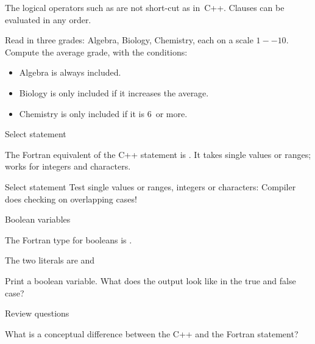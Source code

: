 The logical operators such as  are not short-cut as
in~C++. Clauses can be evaluated in any order.

\begin{exercise}
  Read in three grades: Algebra, Biology, Chemistry, each on a scale
  $1--10$. Compute the average grade, with the conditions:
  \begin{itemize}
  \item Algebra is always included.
  \item Biology is only included if it increases the average.
  \item Chemistry is only included if it is 6~or more.
  \end{itemize}
\end{exercise}

 {Select statement}

The Fortran equivalent of the C++  statement is . It takes
single values or ranges; works for integers and characters.

\begin{block}{Select statement}
  \label{sl:fswitch}
  Test single values or ranges, integers or characters:
  Compiler does checking on overlapping cases!
\end{block}

 {Boolean variables}

The Fortran type for booleans is .

The two literals are  and 

\begin{exercise}
  \label{ex:fprintbool}
  Print a boolean variable. What does the output look like in the true
  and false case?
\end{exercise}

 {Review questions}

\begin{exercise}
  \label{ex:select-vs-switch}
  What is a conceptual difference between the C++  and the
  Fortran  statement?
\end{exercise}
